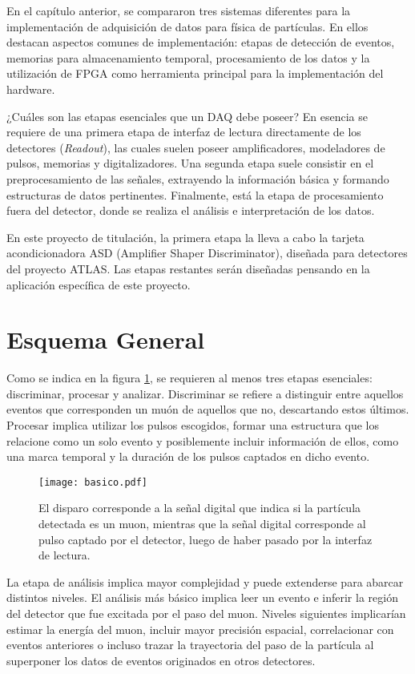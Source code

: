 En el capítulo anterior, se compararon tres sistemas diferentes para la implementación de adquisición de datos para física de partículas. En ellos destacan aspectos comunes de implementación: etapas de detección de eventos, memorias para almacenamiento temporal, procesamiento de los datos y la utilización de FPGA como herramienta principal para la implementación del hardware.

¿Cuáles son las etapas esenciales que un DAQ debe poseer? En esencia se requiere de una primera etapa de interfaz de lectura directamente de los detectores (\textit{Readout}), las cuales suelen poseer amplificadores, modeladores de pulsos, memorias y digitalizadores. Una segunda etapa suele consistir en el preprocesamiento de las señales, extrayendo la información básica y formando estructuras de datos pertinentes. Finalmente, está la etapa de procesamiento fuera del detector, donde se realiza el análisis e interpretación de los datos.

En este proyecto de titulación, la primera etapa la lleva a cabo la tarjeta acondicionadora ASD (Amplifier Shaper Discriminator), diseñada para detectores del proyecto ATLAS. Las etapas restantes serán diseñadas pensando en la aplicación específica de este proyecto.



\section{Esquema General}
	Como se indica en la figura \ref{img:diagrama}, se requieren al menos tres etapas esenciales: discriminar, procesar y analizar. Discriminar se refiere a distinguir entre aquellos eventos que corresponden un muón de aquellos que no, descartando estos últimos. Procesar implica utilizar los pulsos escogidos, formar una estructura que los relacione como un solo evento y posiblemente incluir información de ellos, como una marca temporal y la duración de los pulsos captados en dicho evento. 
	
	\begin{figure}[h]
		\centering
		\texttt{[image: basico.pdf]}
		\caption{El disparo corresponde a la señal digital que indica si la partícula detectada es un muon, mientras que la señal digital corresponde al pulso captado por el detector, luego de haber pasado por la interfaz de lectura.}
		\label{img:diagrama}
	\end{figure}

	La etapa de análisis implica mayor complejidad y puede extenderse para abarcar distintos niveles. El análisis más básico implica leer un evento e inferir la región del detector que fue excitada por el paso del muon. Niveles siguientes implicarían estimar la energía del muon, incluir mayor precisión espacial, correlacionar con eventos anteriores o incluso trazar la trayectoria  del paso de la partícula al superponer los datos de eventos originados en otros detectores.

